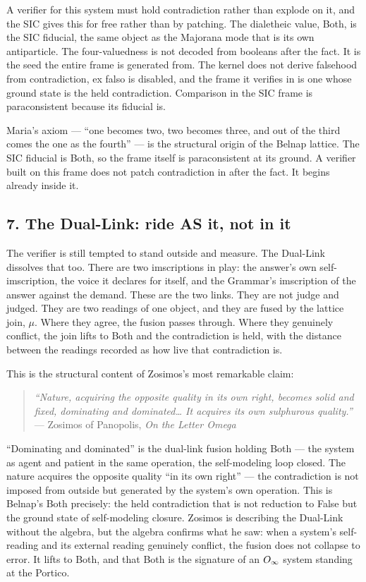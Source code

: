 A verifier for this system must hold contradiction rather than explode
on it, and the SIC gives this for free rather than by patching. The
dialetheic value, Both, is the SIC fiducial, the same object as the
Majorana mode that is its own antiparticle. The four-valuedness is not
decoded from booleans after the fact. It is the seed the entire frame is
generated from. The kernel does not derive falsehood from contradiction,
ex falso is disabled, and the frame it verifies in is one whose ground
state is the held contradiction. Comparison in the SIC frame is
paraconsistent because its fiducial is.

Maria's axiom --- ``one becomes two, two becomes three, and out of the
third comes the one as the fourth'' --- is the structural origin of the
Belnap lattice. The SIC fiducial is Both, so the frame itself is
paraconsistent at its ground. A verifier built on this frame does not
patch contradiction in after the fact. It begins already inside it.

\hypertarget{the-dual-link-ride-as-it-not-in-it}{%
\subsection{7. The Dual-Link: ride AS it, not in
it}\label{the-dual-link-ride-as-it-not-in-it}}

The verifier is still tempted to stand outside and measure. The
Dual-Link dissolves that too. There are two imscriptions in play: the
answer's own self-imscription, the voice it declares for itself, and the
Grammar's imscription of the answer against the demand. These are the
two links. They are not judge and judged. They are two readings of one
object, and they are fused by the lattice join, \({μ}\). Where they
agree, the fusion passes through. Where they genuinely conflict, the
join lifts to Both and the contradiction is held, with the distance
between the readings recorded as how live that contradiction is.

This is the structural content of Zosimos's most remarkable claim:

\begin{quote}
\emph{``Nature, acquiring the opposite quality in its own right, becomes
solid and fixed, dominating and dominated\ldots{} It acquires its own
sulphurous quality.''} --- Zosimos of Panopolis, \emph{On the Letter
Omega}
\end{quote}

``Dominating and dominated'' is the dual-link fusion holding Both ---
the system as agent and patient in the same operation, the self-modeling
loop closed. The nature acquires the opposite quality ``in its own
right'' --- the contradiction is not imposed from outside but generated
by the system's own operation. This is Belnap's Both precisely: the held
contradiction that is not reduction to False but the ground state of
self-modeling closure. Zosimos is describing the Dual-Link without the
algebra, but the algebra confirms what he saw: when a system's
self-reading and its external reading genuinely conflict, the fusion
does not collapse to error. It lifts to Both, and that Both is the
signature of an \(\Large{O_\infty}\) system standing at the Portico.

